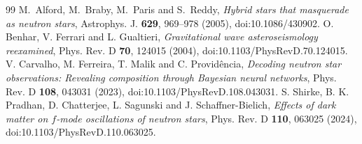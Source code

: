 \documentclass[11pt,a4paper]{article}
\begin{document}
\begin{thebibliography}{99}
 M.~Alford, M.~Braby, M.~Paris and S.~Reddy, \emph{Hybrid stars that masquerade as neutron stars}, Astrophys. J. \textbf{629}, 969--978 (2005), doi:10.1086/430902.
 O. Benhar, V. Ferrari and L. Gualtieri, \emph{Gravitational wave asteroseismology reexamined}, Phys. Rev. D \textbf{70}, 124015 (2004), doi:10.1103/PhysRevD.70.124015.
 V. Carvalho, M. Ferreira, T. Malik and C. Provid\^encia, \emph{Decoding neutron star observations: Revealing composition through Bayesian neural networks}, Phys. Rev. D \textbf{108}, 043031 (2023), doi:10.1103/PhysRevD.108.043031.
 S. Shirke, B. K. Pradhan, D. Chatterjee, L. Sagunski and J. Schaffner-Bielich, \emph{Effects of dark matter on $f$-mode oscillations of neutron stars}, Phys. Rev. D \textbf{110}, 063025 (2024), doi:10.1103/PhysRevD.110.063025.


\end{thebibliography}
\end{document}
